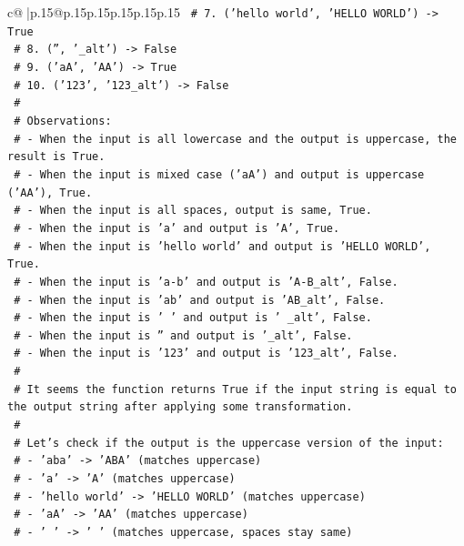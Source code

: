 \documentclass{article}
\begin{document}
{\begin{supertabular}{c@{$\;$}|p{.15\linewidth}@{}p{.15\linewidth}p{.15\linewidth}p{.15\linewidth}p{.15\linewidth}p{.15\linewidth}}
{{{\texttt{    \# 7. ('hello world', 'HELLO WORLD') {-}> True} \\
\texttt{    \# 8. ('', '\_alt') {-}> False} \\
\texttt{    \# 9. ('aA', 'AA') {-}> True} \\
\texttt{    \# 10. ('123', '123\_alt') {-}> False} \\
\texttt{    \#} \\
\texttt{    \# Observations:} \\
\texttt{    \# {-} When the input is all lowercase and the output is uppercase, the result is True.} \\
\texttt{    \# {-} When the input is mixed case ('aA') and output is uppercase ('AA'), True.} \\
\texttt{    \# {-} When the input is all spaces, output is same, True.} \\
\texttt{    \# {-} When the input is 'a' and output is 'A', True.} \\
\texttt{    \# {-} When the input is 'hello world' and output is 'HELLO WORLD', True.} \\
\texttt{    \# {-} When the input is 'a{-}b' and output is 'A{-}B\_alt', False.} \\
\texttt{    \# {-} When the input is 'ab' and output is 'AB\_alt', False.} \\
\texttt{    \# {-} When the input is ' ' and output is ' \_alt', False.} \\
\texttt{    \# {-} When the input is '' and output is '\_alt', False.} \\
\texttt{    \# {-} When the input is '123' and output is '123\_alt', False.} \\
\texttt{    \#} \\
\texttt{    \# It seems the function returns True if the input string is equal to the output string after applying some transformation.} \\
\texttt{    \#} \\
\texttt{    \# Let's check if the output is the uppercase version of the input:} \\
\texttt{    \# {-} 'aba' {-}> 'ABA' (matches uppercase)} \\
\texttt{    \# {-} 'a' {-}> 'A' (matches uppercase)} \\
\texttt{    \# {-} 'hello world' {-}> 'HELLO WORLD' (matches uppercase)} \\
\texttt{    \# {-} 'aA' {-}> 'AA' (matches uppercase)} \\
\texttt{    \# {-} '   ' {-}> '   ' (matches uppercase, spaces stay same)} \\
}}}
\end{supertabular}}
\end{document}
